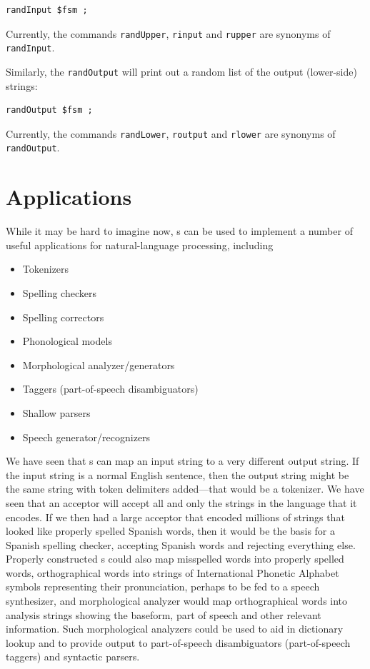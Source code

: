 \begin{Verbatim}
randInput $fsm ;
\end{Verbatim}

\noindent
Currently, the commands \texttt{randUpper}, \texttt{rinput} and
\texttt{rupper} are synonyms of \texttt{randInput}.


Similarly, the \texttt{randOutput} will print out a random list of the output (lower-side) strings:

\begin{Verbatim}
randOutput $fsm ;
\end{Verbatim}

\noindent
Currently, the commands \texttt{randLower}, \texttt{routput} and
\texttt{rlower} are synonyms of \texttt{randOutput}.

\section{Applications}

While it may be hard to imagine now, \fsm{}s can be used to implement a number of useful
applications for natural-language processing, including

\begin{itemize}
\item
Tokenizers
\item
Spelling checkers
\item
Spelling correctors
\item
Phonological models
\item
Morphological analyzer/generators
\item
Taggers (part-of-speech disambiguators)
\item
Shallow parsers
\item
Speech generator/recognizers
\end{itemize}

We have seen that \fst{}s can map an input string to a very different output string.  If
the input string is a normal English sentence, then the output string might be the same
string with token delimiters added---that would be a tokenizer.  We have seen that an
acceptor will accept all and only the strings in the language that it encodes.  If we then
had a large acceptor that encoded millions of strings that looked like properly spelled Spanish words, then
it would be the basis for a Spanish spelling checker, accepting Spanish words and rejecting
everything else.  Properly constructed \fst{}s could also map misspelled words into properly
spelled words, orthographical words into
strings of International Phonetic Alphabet symbols representing their pronunciation,
perhaps to be fed to a speech synthesizer, and
morphological analyzer  would map orthographical words into analysis strings showing
the baseform, part of speech and other relevant information.  Such morphological analyzers
could be used to aid in dictionary lookup and to provide output to
part-of-speech disambiguators (part-of-speech taggers) and syntactic parsers.

